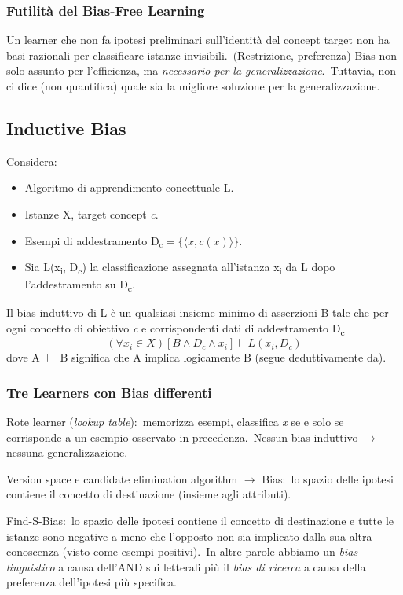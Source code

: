 \subsubsection{Futilità del Bias-Free Learning}

Un learner che non fa ipotesi preliminari sull'identità del concept target non ha basi razionali per classificare istanze invisibili.\
(Restrizione, preferenza) Bias non solo assunto per l'efficienza, ma \textit{necessario per la generalizzazione}.\
Tuttavia, non ci dice (non quantifica) quale sia la migliore soluzione per la generalizzazione.\

\subsection{Inductive Bias}

Considera:
\begin{itemize}
	\item Algoritmo di apprendimento concettuale L.
	\item Istanze X, target concept \textit{c}.
	\item Esempi di addestramento $\mathrm{D_c} = \{\langle x, c(x) \rangle\}$.
	\item Sia L(x\textsubscript{i}, D\textsubscript{c}) la classificazione assegnata all'istanza x\textsubscript{i} da L dopo l'addestramento su D\textsubscript{c}.

\end{itemize}

\begin{definition}
	Il bias induttivo di L è un qualsiasi insieme minimo di asserzioni B tale che per ogni concetto di obiettivo \textit{c} e corrispondenti dati di addestramento D\textsubscript{c}
	\[
		(\forall x_i \in X) [B \land D_c \land x_i] \vdash L(x_i, D_c)
	\]
	dove A $\vdash$ B significa che A implica logicamente B (segue deduttivamente da).
\end{definition}

\subsubsection{Tre Learners con Bias differenti}

Rote learner (\textit{lookup table}):\ memorizza esempi, classifica \textit{x} se e solo se corrisponde a un esempio osservato in precedenza.\
Nessun bias induttivo $\rightarrow$ nessuna generalizzazione.\

Version space e candidate elimination algorithm $\rightarrow$ Bias:\ lo spazio delle ipotesi contiene il concetto di destinazione (insieme agli attributi).\

Find-S-Bias:\ lo spazio delle ipotesi contiene il concetto di destinazione e tutte le istanze sono negative a meno che l'opposto non sia implicato dalla sua altra conoscenza (visto come esempi positivi).\
In altre parole abbiamo un \textit{bias linguistico} a causa dell'AND sui letterali più il \textit{bias di ricerca} a causa della preferenza dell'ipotesi più specifica.\
